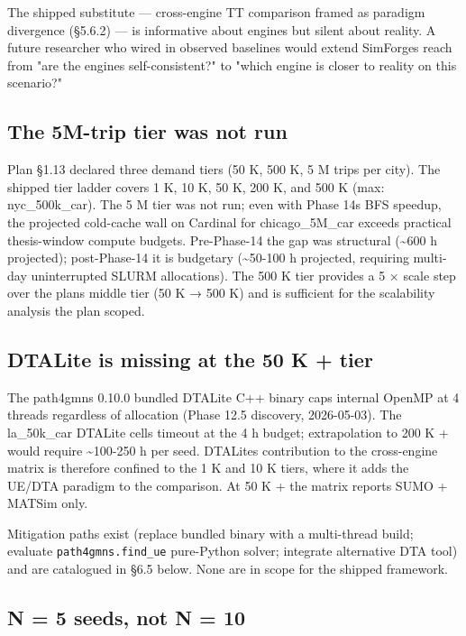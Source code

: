 The shipped substitute --- cross-engine TT comparison framed as paradigm
divergence (§5.6.2) --- is informative about engines but silent about
reality. A future researcher who wired in observed baselines would
extend SimForge\textquotesingle s reach from "are the engines
self-consistent?" to "which engine is closer to reality on this
scenario?"

\subsection{The 5M-trip tier was not
run}\label{642-the-5m-trip-tier-was-not-run}

Plan §1.13 declared three demand tiers (50 K, 500 K, 5 M trips per
city). The shipped tier ladder covers 1 K, 10 K, 50 K, 200 K, and 500 K
(max: nyc\_500k\_car). The 5 M tier was not run; even with Phase
14\textquotesingle s BFS speedup, the projected cold-cache wall on
Cardinal for chicago\_5M\_car exceeds practical thesis-window compute
budgets. Pre-Phase-14 the gap was structural (\textasciitilde600 h
projected); post-Phase-14 it is budgetary (\textasciitilde50-100 h
projected, requiring multi-day uninterrupted SLURM allocations). The 500
K tier provides a 5 × scale step over the plan\textquotesingle s
middle tier (50 K → 500 K) and is sufficient for the scalability
analysis the plan scoped.

\subsection{DTALite is missing at the 50 K +
tier}\label{643-dtalite-is-missing-at-the-50-k--tier}

The path4gmns 0.10.0 bundled DTALite C++ binary caps internal OpenMP at
4 threads regardless of allocation (Phase 12.5 discovery, 2026-05-03).
The la\_50k\_car DTALite cells timeout at the 4 h budget; extrapolation
to 200 K + would require \textasciitilde100-250 h per seed.
DTALite\textquotesingle s contribution to the cross-engine matrix is
therefore confined to the 1 K and 10 K tiers, where it adds the UE/DTA
paradigm to the comparison. At 50 K + the matrix reports SUMO + MATSim
only.

Mitigation paths exist (replace bundled binary with a multi-thread
build; evaluate \texttt{path4gmns.find\_ue} pure-Python solver;
integrate alternative DTA tool) and are catalogued in §6.5 below. None
are in scope for the shipped framework.

\subsection{N = 5 seeds, not N =
10}\label{644-n--5-seeds-not-n--10}

